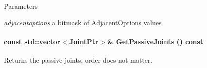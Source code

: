 \begin{DoxyParams}{Parameters}
\item[{\em adjacentoptions}]a bitmask of \hyperlink{classOpenRAVE_1_1KinBody_ace43b2d7d920eeb2eb69299a4784b040}{AdjacentOptions} values \end{DoxyParams}
\hypertarget{classOpenRAVE_1_1KinBody_ab7ece8b3b39a3c9dcc61899dc8dc783e}{
\paragraph[{GetPassiveJoints}]{\setlength{\rightskip}{0pt plus 5cm}const std::vector$<$JointPtr$>$\& GetPassiveJoints () const}\hfill}
\label{classOpenRAVE_1_1KinBody_ab7ece8b3b39a3c9dcc61899dc8dc783e}


Returns the passive joints, order does not matter. 


